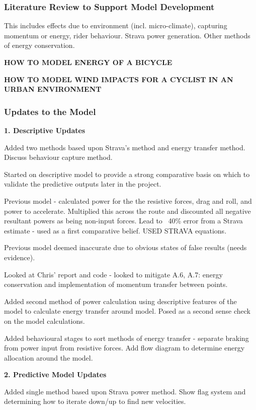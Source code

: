 \documentclass[a4paper, 10pt]{article}
\numberwithin{equation}{section}
\begin{document}
\subsubsection{Literature Review to Support Model Development}

This includes effects due to environment (incl. micro-climate), capturing momentum or energy, rider behaviour. Strava power generation. Other methods of energy conservation.

\textbf{HOW TO MODEL ENERGY OF A BICYCLE}

\textbf{HOW TO MODEL WIND IMPACTS FOR A CYCLIST IN AN URBAN ENVIRONMENT}

\subsubsection{Updates to the Model}

\textbf{1. Descriptive Updates}

Added two methods based upon Strava's method and energy transfer method. Discuss behaviour capture method.

Started on descriptive model to provide a strong comparative basis on which to validate the predictive outputs later in the project.

Previous model - calculated power for the the resistive forces, drag and roll, and power to accelerate. Multiplied this across the route and discounted all negative resultant powers as being non-input forces. Lead to ~40\% error from a Strava estimate - used as a first comparative belief. USED STRAVA equations.

Previous model deemed inaccurate due to obvious states of false results (needs evidence).

Looked at Chris' report and code - looked to mitigate A.6, A.7: energy conservation and implementation of momentum transfer between points.

Added second method of power calculation using descriptive features of the model to calculate energy transfer around model. Posed as a second sense check on the model calculations.

Added behavioural stages to sort methods of energy transfer - separate braking from power input from resistive forces. Add flow diagram to determine energy allocation around the model.

\textbf{2. Predictive Model Updates}

Added single method based upon Strava power method. Show flag system and determining how to iterate down/up to find new velocities.
\end{document}
